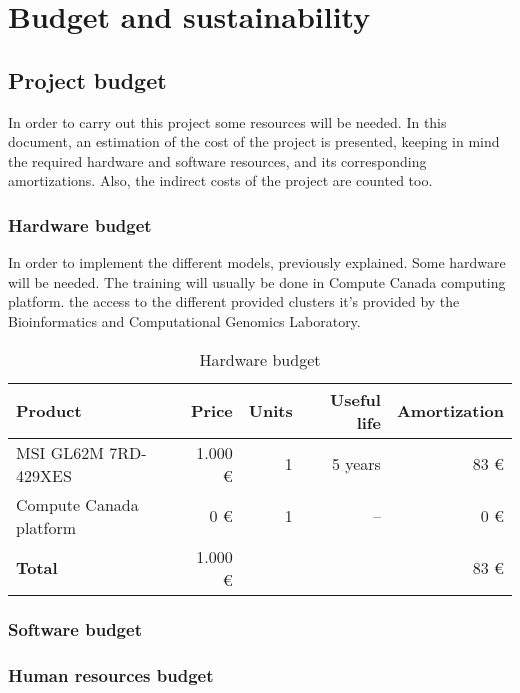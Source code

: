 \section{Budget and sustainability}

\subsection{Project budget}

In order to carry out this project some resources will be needed. In this document, 
an estimation of the cost of the project is presented, keeping in mind the required
hardware and software resources, and its corresponding amortizations. Also, the
indirect costs of the project are counted too.

\subsubsection{Hardware budget}

In order to implement the different models, previously explained. Some hardware will be
needed. The training will usually be done in Compute Canada computing platform. the
access to the different provided clusters it's provided by the Bioinformatics and 
Computational Genomics Laboratory.

\begin{table}[H]
  \begin{tabular}{|l|r|r|r|r|}
    \hline
    \textbf{Product} & \textbf{Price} & \textbf{Units} & \textbf{Useful life} 
    & \textbf{Amortization} \\ \hline\hline

    MSI GL62M 7RD-429XES & 1.000 € & 1 & 5 years & 83 € \\ \hline
    Compute Canada platform & 0 € & 1 & -- & 0 € \\ \hline

    \hline\hline
    \textbf{Total} & 1.000 € & \multicolumn{2}{|c|}{} & 83 € \\ \hline
  \end{tabular}
  \caption{Hardware budget}
\end{table}

\subsubsection{Software budget}

\subsubsection{Human resources budget}

